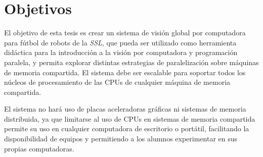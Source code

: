 
\section{Objetivos}

\label{objetivos}

El objetivo de esta tesis es crear un sistema de visión global por computadora
para fútbol de robots de la \emph{SSL}, que pueda ser utilizado como herramienta
didáctica para la introducción a la visión por computadora y programación
paralela, y permita explorar distintas estrategias de paralelización sobre
máquinas de memoria compartida. El sistema debe ser escalable para soportar
todos los núcleos de procesamiento de las CPUs de cualquier máquina de memoria
compartida.

El sistema no hará uso de placas aceleradoras gráficas ni sistemas de memoria
distribuida, ya que limitarse al uso de CPUs en sistemas de memoria compartida
permite su uso en cualquier computadora de escritorio o portátil, facilitando la
disponibilidad de equipos y permitiendo a los alumnos experimentar en sus
propias computadoras.
